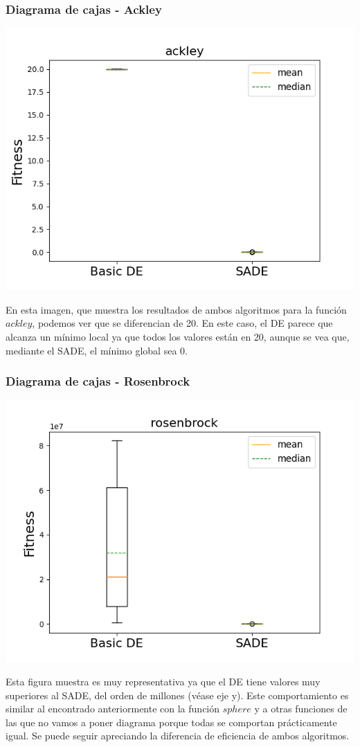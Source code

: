 \documentclass[11pt, a4paper, titlepage]{article}
\begin{document}
\subsubsection{Diagrama de cajas - Ackley}
\begin{center}
\includegraphics[scale=0.85]{ackley}
\end{center}
En esta imagen, que muestra los resultados de ambos algoritmos para la función $ackley$, podemos ver que se diferencian de 20. En este caso, el DE parece que alcanza un mínimo local ya que todos los valores están en 20, aunque se vea que, mediante el SADE, el mínimo global sea 0.
\subsubsection{Diagrama de cajas - Rosenbrock}
\begin{center}
\includegraphics[scale=0.85]{rosenbrock}
\end{center}
Esta figura muestra es muy representativa ya que el DE tiene valores muy superiores al SADE, del orden de millones (véase eje y). Este comportamiento es similar al encontrado anteriormente con la función $sphere$ y a otras funciones de las que no vamos a poner diagrama porque todas se comportan prácticamente igual. Se puede seguir apreciando la diferencia de eficiencia de ambos algoritmos.
\end{document}
